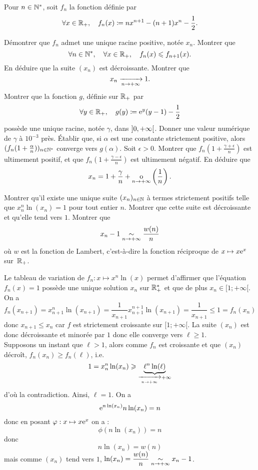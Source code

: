 \documentclass{magnolia}
\begin{document}
Pour $n\in{\mathbb{N}^*}$, soit $f_n$ la fonction définie par 
\[\forall x\in\mathbb{R}_+ ,\quad f_n(x)\coloneqq nx^{n+1}-(n+1)x^n-\frac{1}{2}.\]
\begin{questions}
\question Démontrer que $f_n$ admet une unique racine positive, notée $x_n$.
\question Montrer que
  \[\forall n\in{\mathbb{N}^*},\quad \forall x\in\mathbb{R}_+,\quad f_{n}(x)\leqslant f_{n+1}(x).\]
  En déduire que la suite $(x_n)$ est décroissante.
\question Montrer que \[x_n \xrightarrow[n\rightarrow +\infty]{}1.\]
\question Montrer que la fonction $g$, définie sur $\mathbb{R}_+$ par
  \[\forall y\in\mathbb{R}_+,\quad g(y)\coloneqq{\rm e}^y(y-1)-\frac{1}{2}\]
  possède une unique racine, notée $\gamma$, dans $\left]0,+\infty\right[$. Donner
  une valeur numérique de $\gamma$ à $10^{-3}$ près.
\question Établir que, si $\alpha$ est une constante strictement positive,
  alors $(f_n(1+\frac{\alpha}{n}))_{n\in{\mathbb{N}^*}}$ converge vers $g(\alpha)$.
\question Soit $\epsilon>0$. Montrer que $f_n(1+\frac{\gamma+\epsilon}{n})$
  est ultimement positif, et que $f_n(1+\frac{\gamma-\epsilon}{n})$ est
  ultimement négatif.
\question En déduire que
  \[x_n=1+\frac{\gamma}{n}+\underset{n \rightarrow +\infty}{\text{o}}\left(\frac{1}{n}\right).\]
\end{questions}

\begin{questions}
\question Montrer qu'il existe une unique suite $(x_n)_{n\in\mathbb{N}}$ à termes
  strictement positifs telle que  $x_n^n\ln(x_n)=1$ pour tout entier $n$.
\question Montrer que cette suite est  décroissante et qu'elle tend vers $1$. 
\question Montrer que
  \[x_n-1\underset{n\rightarrow +\infty}{\sim}\frac{w(n)}{n}\]
  où $w$ est la fonction de Lambert, c'est-à-dire la fonction réciproque de
  $x\mapsto x{\rm e}^x$ sur~$\mathbb{R}_+$.
\end{questions}

\begin{sol}
\begin{questions}
\question Le tableau de variation de $f_n : x\mapsto x^n \ln (x)$ permet d'affirmer que l'équation
$f_n(x) = 1$ possède une unique solution $x_n$ sur $\mathbb{R}_+^*$ et que de plus $x_n \in [1;+\infty[$.
\question On a $$f_n(x_{n+1})=x_{n+1}^{n}\ln(x_{n+1})=\frac{1}{x_{n+1}}x_{n+1}^{n+1}\ln(x_{n+1})=\frac{1}{x_{n+1}}\leq 1=f_n(x_n)$$ donc $x_{n+1}\leq x_n$ car $f$ est strictement croissante sur $[1;+\infty[$. La suite $(x_n)$ est donc décroissante et minorée par $1$ donc elle converge vers $\ell \geq 1$. \\
Supposons un instant que $\ell>1$, alors comme $f_n$ est croissante et que $(x_n)$ décroît, $f_n(x_n)\geq f_n(\ell)$, i.e. $$1=x_n^n\ln(x_n)\geqslant \underbrace{\ell^n\ln(\ell)}_{\xrightarrow[n\rightarrow +\infty]{}+\infty}$$ d'où la contradiction. Ainsi, $\ell=1$.
\question On a $${\rm e}^{n\ln(x_n)}n\ln(x_n)=n$$ donc en posant $\varphi : x\mapsto x{\rm e}^x$ on a :
$$\phi(n\ln(x_n))=n$$ donc $$n\ln(x_n)=w(n)$$ mais comme $(x_n)$ tend vers $1$, $\ln(x_n)=\dfrac{w(n)}{n}\underset{n\rightarrow +\infty}{\sim}x_n-1$.
\end{questions}
\end{sol}
\end{document}
